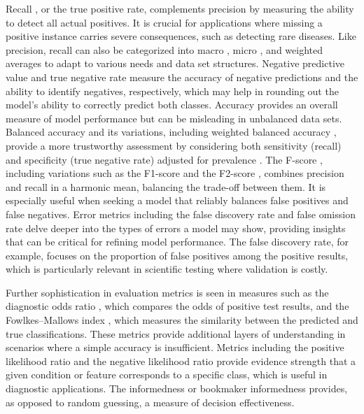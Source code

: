 \documentclass{article}
\begin{document}
Recall \cite{yerushalmy1947statistical, altman1994diagnostic}, or the true positive rate, complements precision by measuring the ability to detect all actual positives. It is crucial for applications where missing a positive instance carries severe consequences, such as detecting rare diseases. Like precision, recall can also be categorized into macro \cite{yang1999evaluation, sebastiani2002machine, rosenberg2012classifying, yang2020edgernn}, micro \cite{yang1999evaluation, sebastiani2002machine}, and weighted averages \cite{gordon1988effect, han2014rule} to adapt to various needs and data set structures. Negative predictive value \cite{altman1994statistics, fletcher2019clinical} and true negative rate \cite{yerushalmy1947statistical, altman1994diagnostic} measure the accuracy of negative predictions and the ability to identify negatives, respectively, which may help in rounding out the model's ability to correctly predict both classes. Accuracy \cite{metz1978basic, taylor1997introduction} provides an overall measure of model performance but can be misleading in unbalanced data sets. Balanced accuracy \cite{brodersen2010balanced, kelleher2020fundamentals} and its variations, including weighted balanced accuracy \cite{salman2017detection, infante2023factors}, provide a more trustworthy assessment by considering both sensitivity (recall) and specificity (true negative rate) adjusted for prevalence \cite{rothman2012epidemiology, bruce2018quantitative}. The F-score \cite{van2004geometry, taha2015metrics}, including variations such as the F1-score \cite{van2004geometry, taha2015metrics} and the F2-score \cite{van2004geometry, taha2015metrics}, combines precision and recall in a harmonic mean, balancing the trade-off between them. It is especially useful when seeking a model that reliably balances false positives and false negatives. Error metrics including the false discovery rate \cite{benjamini1995controlling, benjamini2001control} and false omission rate \cite{zafar2017fairness} delve deeper into the types of errors a model may show, providing insights that can be critical for refining model performance. The false discovery rate, for example, focuses on the proportion of false positives among the positive results, which is particularly relevant in scientific testing where validation is costly.

Further sophistication in evaluation metrics is seen in measures such as the diagnostic odds ratio \cite{glas2003diagnostic, doust2004systematic}, which compares the odds of positive test results, and the Fowlkes--Mallows index \cite{fowlkes1983method, halkidi2001clustering}, which measures the similarity between the predicted and true classifications. These metrics provide additional layers of understanding in scenarios where a simple accuracy is insufficient. Metrics including the positive likelihood ratio \cite{swets1973relative, deeks2004diagnostic} and the negative likelihood ratio \cite{swets1973relative, deeks2004diagnostic} provide evidence strength that a given condition or feature corresponds to a specific class, which is useful in diagnostic applications. The informedness or bookmaker informedness \cite{peirce1884numerical, youden1950index} provides, as opposed to random guessing, a measure of decision effectiveness.
\end{document}
